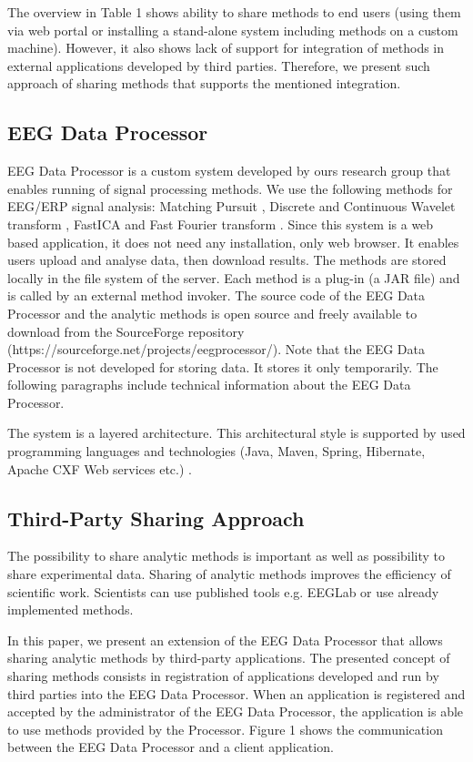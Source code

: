 \documentclass{frontiersSCNS} %
\begin{document}
The overview in Table 1 shows ability to share methods to end users (using them via web portal or installing a stand-alone system including methods on a custom machine). However, it also shows lack of support for integration of methods in external applications developed by third parties. Therefore, we present such approach of sharing methods that supports the mentioned integration.

\subsection{EEG Data Processor}

EEG Data Processor \cite{Jezek13} is a custom system developed by ours research group that enables running of signal processing methods. We use the following methods for EEG/ERP signal analysis: Matching Pursuit \cite{Vareka12}, Discrete and Continuous Wavelet transform \cite{Ciniburk10}, FastICA \cite{Hyv01} and Fast Fourier transform \cite{FFT}. Since this system is a web based application, it does not need any installation, only web browser. It enables users upload and analyse data, then download results. The methods are stored locally in the file system of the server. Each method is a plug-in (a JAR file) and is called by an external method invoker. The source code of the EEG Data Processor and the analytic methods is open source and freely available to download from the SourceForge repository (https://sourceforge.net/projects/eegprocessor/). Note that the EEG Data Processor is not developed for storing data. It stores it only temporarily. The following paragraphs include technical information about the EEG Data Processor.

The system is a layered architecture. This architectural style is supported by used programming languages and technologies (Java, Maven, Spring, Hibernate, Apache CXF Web services etc.) \cite{Jezek13}.

\subsection{Third-Party Sharing Approach}

The possibility to share analytic methods is important as well as possibility to share experimental data. Sharing of analytic methods improves the efficiency of scientific work. Scientists can use published tools e.g. EEGLab or use already implemented methods.

In this paper, we present an extension of the EEG Data Processor that allows sharing analytic methods by third-party applications.
The presented concept of sharing methods consists in registration of applications developed and run by third parties into the EEG Data Processor. When an application is registered and accepted by the administrator of the EEG Data Processor, the application is able to use methods provided by the Processor. Figure 1 shows the communication between the EEG Data Processor and a client application.
\end{document}
